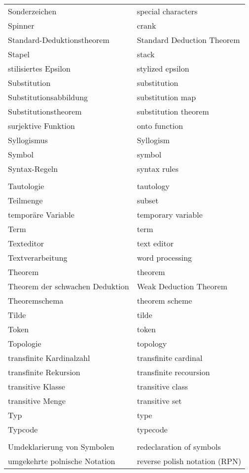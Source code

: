 \begin{longtabu}   { @{} X[l] X[l] }
    Sonderzeichen & special characters \\
    Spinner & crank \\
    Standard-{\allowbreak}Deduktionstheorem & Standard Deduction Theorem \\
    Stapel & stack \\
    stilisiertes Epsilon & stylized epsilon \\
    Substitution & substitution \\
    Substitutionsabbildung & substitution map \\
    Substitutionstheorem & substitution theorem \\
    surjektive Funktion & onto function \\
    Syllogismus & Syllogism \\
    Symbol & symbol \\
    Syntax-Regeln & syntax rules \\
     & \\
    Tautologie & tautology \\
    Teilmenge & subset \\
    temporäre Variable & temporary variable \\
    Term & term \\
    Texteditor & text editor \\
    Textverarbeitung & word processing \\
    Theorem & theorem \\
    Theorem der schwachen Deduktion & Weak Deduction Theorem \\
    Theoremschema & theorem scheme \\
    Tilde & tilde \\
    Token & token \\
    Topologie & topology \\
    transfinite Kardinalzahl & transfinite cardinal \\
    transfinite Rekursion & transfinite recoursion \\
    transitive Klasse & transitive class \\
    transitive Menge & transitive set \\
    Typ & type \\
    Typcode & typecode \\
     & \\
    Umdeklarierung von Symbolen & redeclaration of symbols \\
    umgekehrte polnische Notation & reverse polish notation (RPN) \\

\end{longtabu}
